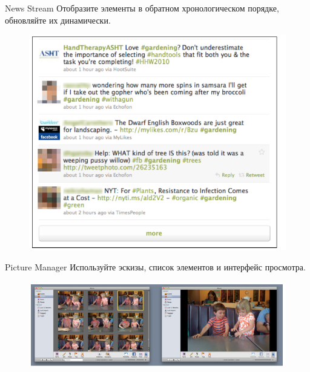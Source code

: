 \documentclass{beamer}
\begin{document}
\begin{frame}[t]{News Stream}
	Отобразите элементы в обратном хронологическом порядке, обновляйте их динамически.
	\begin{figure}[h]
		\centering
		\includegraphics[scale=0.5]{images/lec07-pic04.png}
	\end{figure}
\end{frame} 

\begin{frame}[t]{Picture Manager}
	Используйте эскизы, список элементов и интерфейс просмотра.
	\begin{figure}[h]
		\centering
		\includegraphics[scale=0.6]{images/lec07-pic06.png}
	\end{figure}
\end{frame} 
\end{document}
